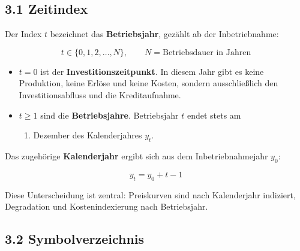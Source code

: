 \documentclass[
  a4paper,
  10pt]{article}
\providecommand{\tightlist}{%
  \setlength{\itemsep}{0pt}\setlength{\parskip}{0pt}}
\begin{document}
\hypertarget{zeitindex}{%
\subsection{3.1 Zeitindex}\label{zeitindex}}

Der Index \(t\) bezeichnet das \textbf{Betriebsjahr}, gezählt ab der
Inbetriebnahme:

\[ t \in \{0, 1, 2, \dots, N\}, \qquad N = \text{Betriebsdauer in Jahren} \]

\begin{itemize}
\tightlist
\item
  \(t = 0\) ist der \textbf{Investitionszeitpunkt}. In diesem Jahr gibt
  es keine Produktion, keine Erlöse und keine Kosten, sondern
  ausschließlich den Investitionsabfluss und die Kreditaufnahme.
\item
  \(t \geq 1\) sind die \textbf{Betriebsjahre}. Betriebsjahr \(t\) endet
  stets am

  \begin{enumerate}
  \def\labelenumi{\arabic{enumi}.}
  \setcounter{enumi}{30}
  \tightlist
  \item
    Dezember des Kalenderjahres \(y_t\).
  \end{enumerate}
\end{itemize}

Das zugehörige \textbf{Kalenderjahr} ergibt sich aus dem
Inbetriebnahmejahr \(y_0\):

\[ y_t = y_0 + t - 1 \]

Diese Unterscheidung ist zentral: Preiskurven sind nach Kalenderjahr
indiziert, Degradation und Kostenindexierung nach Betriebsjahr.

\hypertarget{symbolverzeichnis}{%
\subsection{3.2 Symbolverzeichnis}\label{symbolverzeichnis}}
\end{document}
